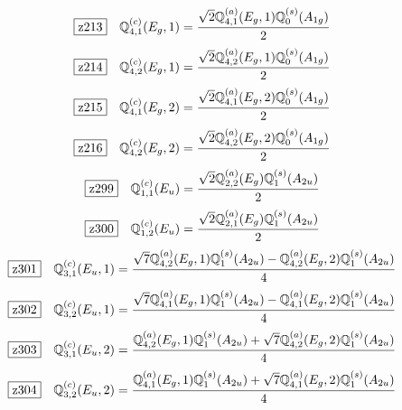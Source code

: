 \documentclass[fleqn,10pt,landscape]{jsarticle}
\begin{document}
\begin{dmath*}
\hspace*{3mm}\fbox{z213}\quad \mathbb{Q}_{4,1}^{(c)}(E_{g},1)=\frac{\sqrt{2} \mathbb{Q}_{4,1}^{(a)}(E_{g},1) \mathbb{Q}_{0}^{(s)}(A_{1g})}{2}
\end{dmath*}
\begin{dmath*}
\hspace*{3mm}\fbox{z214}\quad \mathbb{Q}_{4,2}^{(c)}(E_{g},1)=\frac{\sqrt{2} \mathbb{Q}_{4,2}^{(a)}(E_{g},1) \mathbb{Q}_{0}^{(s)}(A_{1g})}{2}
\end{dmath*}
\begin{dmath*}
\hspace*{3mm}\fbox{z215}\quad \mathbb{Q}_{4,1}^{(c)}(E_{g},2)=\frac{\sqrt{2} \mathbb{Q}_{4,1}^{(a)}(E_{g},2) \mathbb{Q}_{0}^{(s)}(A_{1g})}{2}
\end{dmath*}
\begin{dmath*}
\hspace*{3mm}\fbox{z216}\quad \mathbb{Q}_{4,2}^{(c)}(E_{g},2)=\frac{\sqrt{2} \mathbb{Q}_{4,2}^{(a)}(E_{g},2) \mathbb{Q}_{0}^{(s)}(A_{1g})}{2}
\end{dmath*}
\begin{dmath*}
\hspace*{3mm}\fbox{z299}\quad \mathbb{Q}_{1,1}^{(c)}(E_{u})=\frac{\sqrt{2} \mathbb{Q}_{2,2}^{(a)}(E_{g}) \mathbb{Q}_{1}^{(s)}(A_{2u})}{2}
\end{dmath*}
\begin{dmath*}
\hspace*{3mm}\fbox{z300}\quad \mathbb{Q}_{1,2}^{(c)}(E_{u})=\frac{\sqrt{2} \mathbb{Q}_{2,1}^{(a)}(E_{g}) \mathbb{Q}_{1}^{(s)}(A_{2u})}{2}
\end{dmath*}
\begin{dmath*}
\hspace*{3mm}\fbox{z301}\quad \mathbb{Q}_{3,1}^{(c)}(E_{u},1)=\frac{\sqrt{7} \mathbb{Q}_{4,2}^{(a)}(E_{g},1) \mathbb{Q}_{1}^{(s)}(A_{2u}) - \mathbb{Q}_{4,2}^{(a)}(E_{g},2) \mathbb{Q}_{1}^{(s)}(A_{2u})}{4}
\end{dmath*}
\begin{dmath*}
\hspace*{3mm}\fbox{z302}\quad \mathbb{Q}_{3,2}^{(c)}(E_{u},1)=\frac{\sqrt{7} \mathbb{Q}_{4,1}^{(a)}(E_{g},1) \mathbb{Q}_{1}^{(s)}(A_{2u}) - \mathbb{Q}_{4,1}^{(a)}(E_{g},2) \mathbb{Q}_{1}^{(s)}(A_{2u})}{4}
\end{dmath*}
\begin{dmath*}
\hspace*{3mm}\fbox{z303}\quad \mathbb{Q}_{3,1}^{(c)}(E_{u},2)=\frac{\mathbb{Q}_{4,2}^{(a)}(E_{g},1) \mathbb{Q}_{1}^{(s)}(A_{2u}) + \sqrt{7} \mathbb{Q}_{4,2}^{(a)}(E_{g},2) \mathbb{Q}_{1}^{(s)}(A_{2u})}{4}
\end{dmath*}
\begin{dmath*}
\hspace*{3mm}\fbox{z304}\quad \mathbb{Q}_{3,2}^{(c)}(E_{u},2)=\frac{\mathbb{Q}_{4,1}^{(a)}(E_{g},1) \mathbb{Q}_{1}^{(s)}(A_{2u}) + \sqrt{7} \mathbb{Q}_{4,1}^{(a)}(E_{g},2) \mathbb{Q}_{1}^{(s)}(A_{2u})}{4}
\end{dmath*}
\vspace{5mm}
\end{document}
